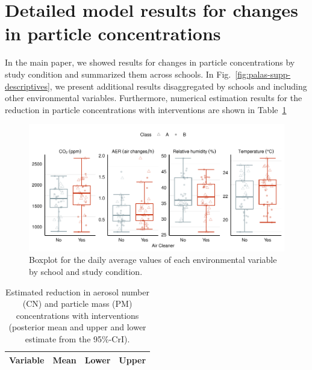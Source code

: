 \documentclass[fleqn,11pt]{wlscirep_supp}
\begin{document}
\clearpage

\section{Detailed model results for changes in particle concentrations}\label{sec:detailed-palas}

In the main paper, we showed results for changes in particle concentrations by study condition and summarized them across schools. In Fig.~\ref{fig:palas-supp-descriptives}, we present additional results disaggregated by schools and including other environmental variables. Furthermore, numerical estimation results for the reduction in particle concentrations with interventions are shown in Table~\ref{tab:palas-est-results}

\begin{figure}[!htb]
\centering
    \includegraphics[width=\linewidth]{../../results/env-data/otherVars-boxplot.pdf}
    \caption[Boxplot of environmental variables by school and study condition]{Boxplot for the daily average values of each environmental variable by school and study condition.}
    \label{fig:env-descriptives-other-vars}
\end{figure}

\begin{table}[!htpb]
    \caption[Estimated reduction in aerosol and particle concentrations with interventions]{Estimated reduction in aerosol number (CN) and particle mass (PM) concentrations with interventions (posterior mean and upper and lower estimate from the 95\%-CrI).}
    \label{tab:palas-est-results}
    \centering
    \footnotesize
    \begin{tabular}{l r r r}
    \toprule
    Variable & Mean & Lower & Upper \\
    \midrule
    
    \bottomrule
    \end{tabular}
    
\end{table}

\clearpage


\end{document}

